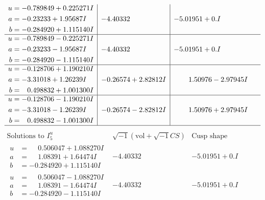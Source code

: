\documentclass[1p]{elsarticle_modified}
\theoremstyle{definition}
\newcommand{\I}{\sqrt{-1}}
\begin{document}
$$\begin{array}{c|c|c}
\begin{aligned}
u &= -0.789849 + 0.225271 I \\
a &= -0.23233 + 1.95687 I \\
b &= -0.284920 + 1.115140 I\end{aligned}
 & -4.40332\phantom{ +0.000000I} & -5.01951 + 0. I\phantom{ +0.000000I} \\ \hline\begin{aligned}
u &= -0.789849 - 0.225271 I \\
a &= -0.23233 - 1.95687 I \\
b &= -0.284920 - 1.115140 I\end{aligned}
 & -4.40332\phantom{ +0.000000I} & -5.01951 + 0. I\phantom{ +0.000000I} \\ \hline\begin{aligned}
u &= -0.128706 + 1.190210 I \\
a &= -3.31018 + 1.26239 I \\
b &= \phantom{-}0.498832 + 1.001300 I\end{aligned}
 & -0.26574 + 2.82812 I & \phantom{-}1.50976 - 2.97945 I \\ \hline\begin{aligned}
u &= -0.128706 - 1.190210 I \\
a &= -3.31018 - 1.26239 I \\
b &= \phantom{-}0.498832 - 1.001300 I\end{aligned}
 & -0.26574 - 2.82812 I & \phantom{-}1.50976 + 2.97945 I\\
 \hline 
 \end{array}$$\newpage$$\begin{array}{c|c|c}  
\text{Solutions to }I^u_{5}& \I (\text{vol} + \sqrt{-1}CS) & \text{Cusp shape}\\
 \hline 
\begin{aligned}
u &= \phantom{-}0.506047 + 1.088270 I \\
a &= \phantom{-}1.08391 + 1.64474 I \\
b &= -0.284920 + 1.115140 I\end{aligned}
 & -4.40332\phantom{ +0.000000I} & -5.01951 + 0. I\phantom{ +0.000000I} \\ \hline\begin{aligned}
u &= \phantom{-}0.506047 - 1.088270 I \\
a &= \phantom{-}1.08391 - 1.64474 I \\
b &= -0.284920 - 1.115140 I\end{aligned}
 & -4.40332\phantom{ +0.000000I} & -5.01951 + 0. I\phantom{ +0.000000I} \\ \hline\begin{aligned}

\end{aligned}
\end{array}$$
\end{document}
